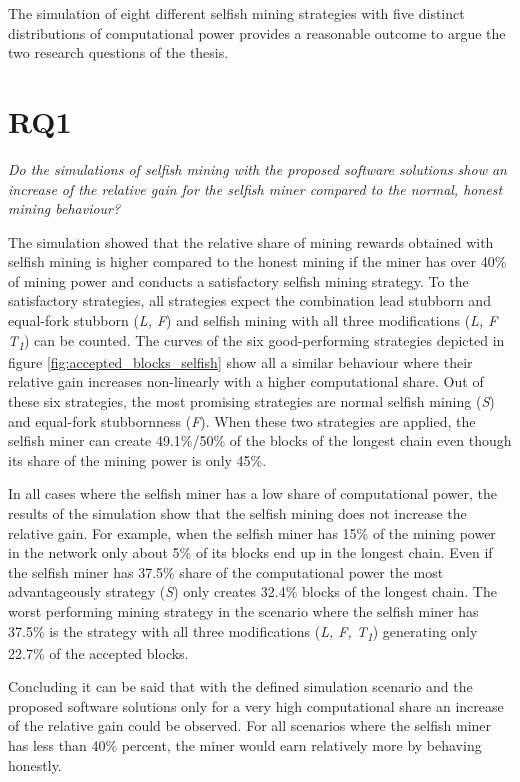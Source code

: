 The simulation of eight different selfish mining strategies with five distinct distributions of computational power provides a reasonable outcome to argue the two research questions of the thesis.

\section{RQ1}

\textit{Do the simulations of selfish mining with the proposed software solutions show an increase of the relative gain for the selfish miner compared to the normal, honest mining behaviour?}

The simulation showed that the relative share of mining rewards obtained with selfish mining is higher compared to the honest mining if the miner has over 40\% of mining power and conducts a satisfactory selfish mining strategy.
To the satisfactory strategies, all strategies expect the combination lead stubborn and equal-fork stubborn (\textit{L, F}) and selfish mining with all three modifications (\textit{L, F T\textsubscript{1}}) can be counted.
The curves of the six good-performing strategies depicted in figure \ref{fig:accepted_blocks_selfish} show all a similar behaviour where their relative gain increases non-linearly with a higher computational share.
Out of these six strategies, the most promising strategies are normal selfish mining (\textit{S}) and equal-fork stubbornness (\textit{F}).
When these two strategies are applied, the selfish miner can create 49.1\%/50\% of the blocks of the longest chain even though its share of the mining power is only 45\%.

In all cases where the selfish miner has a low share of computational power, the results of the simulation show that the selfish mining does not increase the relative gain.
For example, when the selfish miner has 15\% of the mining power in the network only about 5\% of its blocks end up in the longest chain.
Even if the selfish miner has 37.5\% share of the computational power the most advantageously strategy (\textit{S}) only creates 32.4\% blocks of the longest chain.
The worst performing mining strategy in the scenario where the selfish miner has 37.5\% is the strategy with all three modifications (\textit{L, F, T\textsubscript{1}}) generating only 22.7\% of the accepted blocks.

Concluding it can be said that with the defined simulation scenario and the proposed software solutions only for a very high computational share an increase of the relative gain could be observed.
For all scenarios where the selfish miner has less than 40\% percent, the miner would earn relatively more by behaving honestly.

